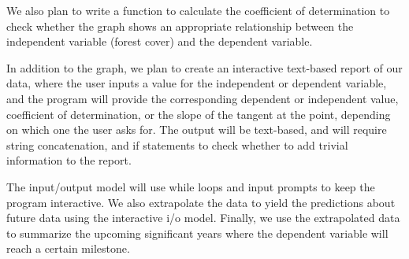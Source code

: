 \documentclass[12pt]{article}
\begin{document}
\begin{enumerate}
\begin{text}
We also plan to write a function to calculate the coefficient of determination to check whether the graph shows an appropriate relationship between the independent variable (forest cover) and the dependent variable.

In addition to the graph, we plan to create an interactive text-based report of our data, where the user  inputs a value for the independent or dependent variable, and the program will provide the corresponding dependent or independent value, coefficient of determination, or the slope of the tangent at the point, depending on which one the user asks for. The output will be text-based, and will require string concatenation, and if statements to check whether to add trivial information to the report.

The input/output model will use while loops and input prompts to keep the program interactive. We also extrapolate the data to yield the predictions about future data using the interactive i/o model. Finally, we use the extrapolated data to summarize the upcoming significant years where the dependent variable will reach a certain milestone.

\end{text}

\maketitle

\newpage




\end{enumerate}
\end{document}

